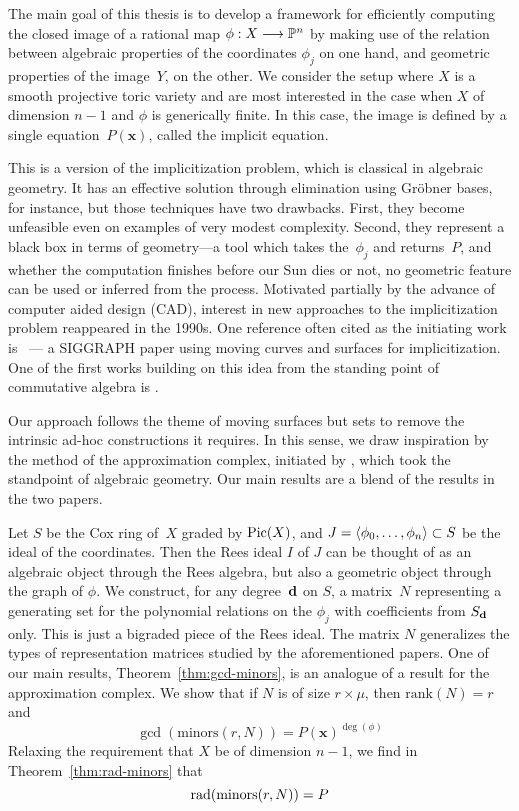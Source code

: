 \documentclass[fleqn,reqno]{amsart}
\begin{document}

The main goal of this thesis is to develop a framework for
efficiently computing the closed image of a rational map $\phi:X\longrightarrow\mathbb{P}^n$ by
making use of the relation between algebraic properties of the coordinates $\phi_j$ on one hand,
and geometric properties of the image~$Y$, on the other.
We consider the setup where $X$ is a smooth projective toric variety
and are most interested in the case when $X$ of dimension $n-1$ and $\phi$ is generically finite.
In this case,
the image is defined by a single equation~$P(\mathbf x)$,
called the implicit equation.

This is a version of the implicitization problem, which is classical in algebraic geometry.
It has an effective solution through elimination using Gr\"obner bases, for instance,
but those techniques have two drawbacks.
First, they become unfeasible even on examples of very modest complexity.
Second, they represent a black box in terms of geometry---a tool which
takes the~$\phi_j$ and returns~$P$,
and whether the computation finishes before our Sun dies or not,
no geometric feature can be used or inferred from the process.
Motivated partially by the advance of computer aided design (CAD),
interest in new approaches to the implicitization problem
reappeared in the 1990s.
One reference often cited as the initiating work is \cite{SC-95}~---
a SIGGRAPH paper using moving curves and surfaces for implicitization.
One of the first works building on this idea from the standing point
of commutative algebra is \citet{CGZ-00}.

Our approach follows the theme of moving surfaces but sets to remove the intrinsic
ad-hoc constructions it requires.
In this sense,
we draw inspiration by the method of the approximation complex, initiated by \citet{BJ-03},
which took the standpoint of algebraic geometry.
Our main results are a blend of the results in the two papers.

Let $S$ be the Cox ring of~$X$ graded by $\operatorname{Pic}(X)$,
and $J=\langle\phi_0,\ldots,\phi_n\rangle\subset S$ be the ideal of the coordinates.
Then the Rees ideal $I$ of $J$ can be thought of as
an algebraic object through the Rees algebra, but also
a geometric object through the graph of $\phi$.
We construct, for any degree~$\mathbf d$ on $S$,
a matrix~$N$ representing a generating set for the polynomial relations on the $\phi_j$
with coefficients from $S_\mathbf d$ only.
This is just a bigraded piece of the Rees ideal.
The matrix $N$ generalizes the types of representation matrices
studied by the aforementioned papers.
One of our main results, Theorem~\ref{thm:gcd-minors},
is an analogue of a result for the approximation complex.
We show that if $N$ is of size $r\times\mu$, then $\text{rank}(N)=r$ and
\[
	\gcd(\text{minors}(r,N))=P(\mathbf x)^{\deg(\phi)}
\]
Relaxing the requirement that $X$ be of dimension $n-1$,
we find in Theorem~\ref{thm:rad-minors} that
\[
	\operatorname{rad}(\text{minors}(r,N))=P
\]
\end{document}
